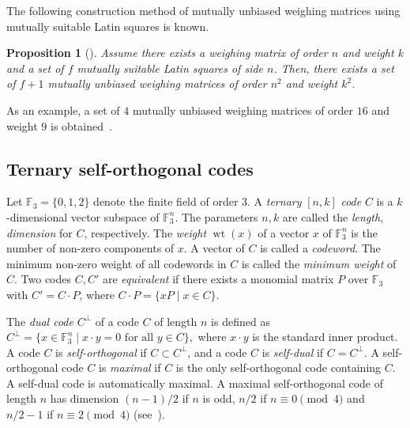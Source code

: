 \documentclass[12pt]{article}
\newtheorem{prop}[thm]{Proposition}
\theoremstyle{remark}
\newcommand{\FF}{\mathbb{F}}
\DeclareMathOperator{\wt}{wt}
\begin{document}
The following construction method of mutually unbiased weighing matrices
using mutually suitable Latin squares
is known.

\begin{prop}[{\cite[Theorem~2.12]{HKO}}]\label{prop:HKO}
Assume there exists a weighing matrix of order $n$ and weight $k$  
and a set of $f$ mutually suitable Latin squares of side $n$. 
Then,
there exists a set of $f+1$ mutually unbiased weighing matrices of order $n^2$ and weight $k^2$.
\end{prop}

As an example, a set of $4$ mutually unbiased weighing matrices of order $16$ and
weight $9$ is obtained~\cite{HKO}.

\subsection{Ternary self-orthogonal codes}
Let $\FF_3=\{0,1,2\}$ denote the finite field of order $3$.
A \emph{ternary} $[n,k]$ \emph{code} $C$ is a $k$-dimensional vector subspace
of $\FF_3^n$.
The parameters $n, k$ are called the \emph{length}, \emph{dimension} for $C$,
respectively.
The \emph{weight} $\wt(x)$ of a vector $x$ of $\FF_3^n$ is 
the number of non-zero components of $x$.
A vector of $C$ is called a \emph{codeword}.
The minimum non-zero weight of all codewords in $C$ is called
the \emph{minimum weight} of $C$.
Two codes $C,C'$ are \emph{equivalent} if there exists a
monomial matrix $P$ over $\mathbb{F}_3$ with $C' = C \cdot P$,
where $C \cdot P = \{ x P\mid x \in C\}$.
% 

The \emph{dual code} $C^{\perp}$ of a code
$C$ of length $n$ is defined as
$
C^{\perp}=
\{x \in \FF_3^n \mid x \cdot y = 0 \text{ for all } y \in C\},
$
where $x \cdot y$ is the standard inner product.
A code $C$ is \emph{self-orthogonal} if $C \subset C^\perp$, and
a code $C$ is \emph{self-dual} if $C=C^\perp$.
A self-orthogonal code $C$ is \emph{maximal} if $C$ is
the only self-orthogonal code containing $C$.
A self-dual code is automatically maximal.
A maximal self-orthogonal code of length $n$
has dimension $(n-1)/2$ if $n$ is odd,
$n/2$ if $n \equiv 0 \pmod 4$ and 
$n/2-1$ if $n \equiv 2 \pmod 4$ (see~\cite{MPS}).
\end{document}
